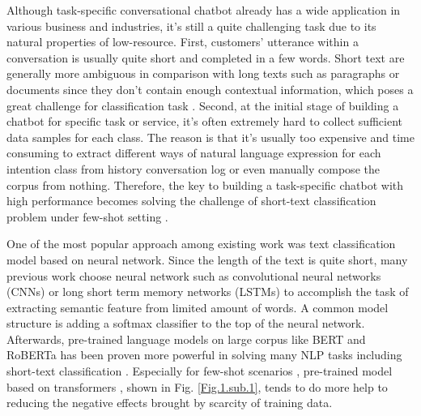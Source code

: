 \documentclass[letterpaper]{article} %
\begin{document}
  Although  task-specific  conversational chatbot already has a wide application
  in various business and industries, it's still a quite challenging task due to
  its  natural  properties of low-resource. First, customers' utterance within a
  conversation  is  usually  quite  short  and  completed  in a few words. Short
  text \cite{song2014short}  are generally more ambiguous in comparison with long
  texts  such  as  paragraphs  or  documents  since  they  don't  contain enough
  contextual  information,  which poses a great challenge \cite{chen2019deep} for
  classification        task \cite{phan2008learning,yan2009dynamic,hua2015short}.
  Second,  at  the  initial  stage  of  building  a chatbot for specific task or
  service, it's often extremely hard to collect sufficient data samples for each
  class.  The  reason  is  that it's usually too expensive and time consuming to
  extract  different  ways  of natural language expression for each intention class
  from  history  conversation  log  or  even  manually  compose  the corpus from
  nothing.  Therefore,  the  key  to  building a task-specific chatbot with high
  performance     becomes     solving     the     challenge     of    short-text
  classification \cite{sriram2010short}        problem       under       few-shot
  setting \cite{yu2018diverse}.

  One  of  the most popular approach among existing work was text classification
  model  based  on  neural network. Since the length of the text is quite short,
  many   previous   work \cite{wen2016network}  choose  neural  network  such  as
  convolutional                          neural                         networks
  (CNNs) \cite{kim2014convolutional,zhang2015character,conneau2016very}  or  long
  short  term memory networks (LSTMs) \cite{mousa2017contextual,liu2016recurrent}
  to  accomplish  the task of extracting semantic feature from limited amount of
  words.  A  common model structure is adding a softmax classifier to the top of
  the  neural  network.  Afterwards, pre-trained language models on large corpus
  like   BERT \cite{devlin2018bert}  and  RoBERTa \cite{liu2019roberta}  has  been
  proven   more   powerful  in  solving  many  NLP  tasks  including  short-text
  classification \cite{madabushi2020cost}.      Especially      for      few-shot
  scenarios \cite{yu2018diverse},       pre-trained      model      based      on
  transformers \cite{vaswani2017attention},   shown  in  Fig.  \ref{Fig.1.sub.1},
  tends  to do more help to reducing the negative effects brought by scarcity of
  training data.
\end{document}
